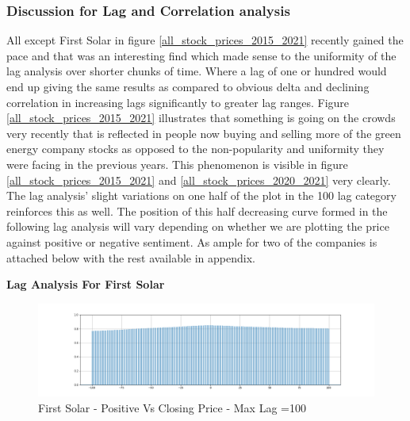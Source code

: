 \documentclass[sigconf, nonacm]{acmart}
\begin{document}
\subsubsection{Discussion for Lag and Correlation analysis } 
All except First Solar in figure \ref{all_stock_prices_2015_2021} recently gained the pace and that was an interesting find which made sense to the uniformity of the lag analysis over shorter chunks of time. Where a lag of one or hundred would end up giving the same results as compared to obvious delta and declining correlation in increasing lags significantly to greater lag ranges.
Figure \ref{all_stock_prices_2015_2021} illustrates that something is going on the crowds very recently that is reflected in people now buying and selling more of the green energy company stocks as opposed to the non-popularity and uniformity they were facing in the previous years. This phenomenon is visible in figure \ref{all_stock_prices_2015_2021} and \ref{all_stock_prices_2020_2021} very clearly. The lag analysis' slight variations on one half of the plot in the 100 lag category reinforces this as well. The position of this half decreasing curve formed in the following lag analysis will vary depending on whether we are plotting the price against positive or negative sentiment. As ample for two of the companies is attached below with the rest available in appendix. \newline


\newline
\textbf{Lag Analysis For First Solar}
\begin{figure}[H]
  \centering
  \includegraphics[width=\linewidth]{images/fslr_100_pos.png}
  \caption{First Solar - Positive Vs Closing Price - Max Lag =100}
  \label{fslr_100_pos}
\end{figure}
\end{document}
